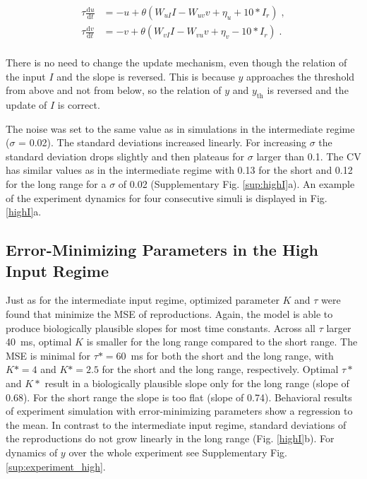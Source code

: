 \documentclass[10pt]{article}
\begin{document}
\begin{equation} \label{EqhighI}
	\begin{split}
	\tau\frac{\text{d}u}{\text{d}t} & = -u + \theta(W_{uI}I - W_{uv}v + \eta_u + 10*I_r) \;,\\
	\tau\frac{\text{d}v}{\text{d}t} & = -v + \theta(W_{vI}I - W_{vu}v + \eta_v - 10*I_r) \;.\\
	\end{split}
\end{equation}

There is no need to change the update mechanism, even though the relation of the input $I$ and the slope is reversed. This is because $y$ approaches the threshold from above and not from below, so the relation of $y$ and $y_{\text{th}}$ is reversed and the update of $I$ is correct. 

The noise was set to the same value as in simulations in the intermediate regime ($\sigma$ = 0.02). The standard deviations increased linearly. For increasing $\sigma$ the standard deviation drops slightly and then plateaus for $\sigma$ larger than 0.1. The CV has similar values as in the intermediate regime with 0.13 for the short and 0.12 for the long range for a $\sigma$ of 0.02 (Supplementary Fig. \ref{sup:highI}a). 
An example of the experiment dynamics for four consecutive simuli is displayed in Fig. \ref{highI}a.

\subsection{Error-Minimizing Parameters in the High Input Regime}
Just as for the intermediate input regime, optimized parameter $K$ and $\tau$ were found that minimize the MSE of reproductions. 
Again, the model is able to produce biologically plausible slopes for most time constants. 
Across all $\tau$ larger 40~ms, optimal $K$ is smaller for the long range compared to the short range.
The MSE is minimal for $\tau* = 60$~ms for both the short and the long range, with $K* = 4$ and $K* = 2.5$  for the short and the long range, respectively. Optimal $\tau*$ and $K*$ result in a biologically plausible slope only for the long range (slope of 0.68). For the short range the slope is too flat (slope of 0.74).
Behavioral results of experiment simulation with error-minimizing parameters show a regression to the mean. In contrast to the intermediate input regime, standard deviations of the reproductions do not grow linearly in the long range (Fig. \ref{highI}b).
For dynamics of $y$ over the whole experiment see Supplementary Fig. \ref{sup:experiment_high}.
\end{document}
